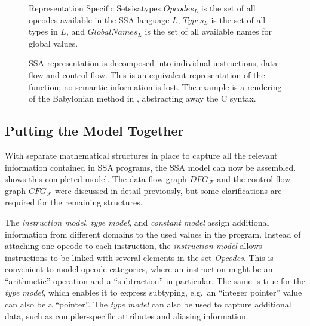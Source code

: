 \begin{figure}[h]
\begin{definition}{Representation Specific Sets}{isatypes}
    $Opcodes_L$ is the set of all opcodes available in the SSA language $L$,
    $Types_L$ is the set of all types in $L$,
    and $GlobalNames_L$ is the set of all available names for global values.
\end{definition}
\end{figure}

\begin{figure}[p]

\caption{SSA representation is decomposed into individual instructions, data
         flow and control flow.
         This is an equivalent representation of the function; no semantic
         information is lost.
         The example is a rendering of the Babylonian method in
         , abstracting away the C syntax.
         \parfillskip=0pt}
\label{fig:separation}
\end{figure}

\subsection{Putting the Model Together}

\begin{figure}[p]
    
\end{figure}

    With separate mathematical structures in place to capture all the relevant
    information contained in SSA programs, the SSA model can now be assembled.
     shows this completed model.
    The data flow graph $DFG_\mathcal F$ and the control flow graph
    $CFG_\mathcal F$ were discussed in detail previously, but some
    clarifications are required for the remaining structures.

    The {\it instruction model}, {\it type model}, and {\it constant model}
    assign additional information from different domains to the used values in
    the program.
    Instead of attaching one opcode to each instruction, the
    {\it instruction model} allows instructions to be linked with several
    elements in the set {\it Opcodes}.
    This is convenient to model opcode categories, where an instruction might be
    an ``arithmetic'' operation and a ``subtraction'' in particular.
    The same is true for the {\it type model}, which enables it to express
    subtyping, e.g.\ an ``integer pointer'' value can also be a ``pointer''.
    The {\it type model} can also be used to capture additional data, such as
    compiler-specific attributes and aliasing information.
    
